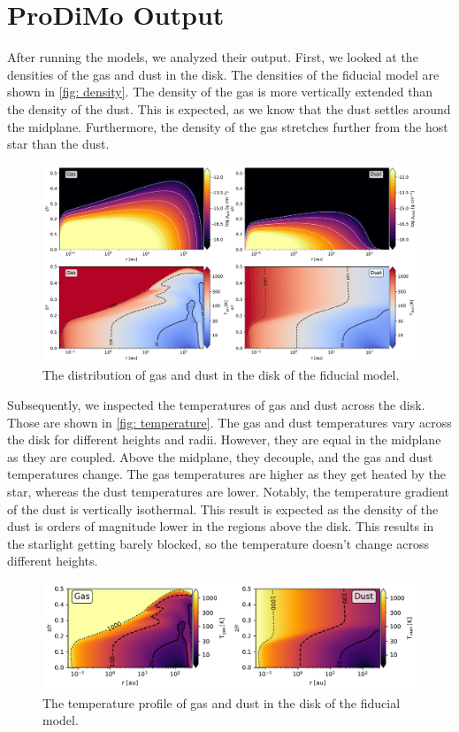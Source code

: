 \documentclass[oneside, single, authoryear, semicolon]{lion-msc}
\newcommand{\4}{$_4$}
\newcommand{\3}{$_3$}
\newcommand{\2}{$_2$}
\begin{document}
\section{ProDiMo Output}
After running the models, we analyzed their output. First, we looked at the densities of the gas and dust in the disk. The densities of the fiducial model are shown in \autoref{fig: density}. The density of the gas is more vertically extended than the density of the dust. This is expected, as we know that the dust settles around the midplane. Furthermore, the density of the gas stretches further from the host star than the dust.

\begin{figure}[!ht]
    \centering
    \includegraphics[width=\linewidth]{Figures/DensityTemperature.pdf}
    \caption{The distribution of gas and dust in the disk of the fiducial model.}
    \label{fig: density}
\end{figure}

Subsequently, we inspected the temperatures of gas and dust across the disk. Those are shown in \autoref{fig: temperature}.  The gas and dust temperatures vary across the disk for different heights and radii. However, they are equal in the midplane as they are coupled. Above the midplane, they decouple, and the gas and dust temperatures change. The gas temperatures are higher as they get heated by the star, whereas the dust temperatures are lower. Notably, the temperature gradient of the dust is vertically isothermal. This result is expected as the density of the dust is orders of magnitude lower in the regions above the disk. This results in the starlight getting barely blocked, so the temperature doesn't change across different heights.

\begin{figure}[!ht]
    \centering
    \includegraphics[width=\linewidth]{Figures/Temperature.pdf}
    \caption{The temperature profile of gas and dust in the disk of the fiducial model.}
    \label{fig: temperature}
\end{figure}
\end{document}
